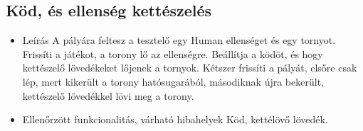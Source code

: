 \subsection{Köd, és ellenség kettészelés}
\begin{itemize}
\item Leírás\newline
A pályára feltesz a tesztelő egy Human ellenséget és egy tornyot. Frissíti a játékot, a torony lő az ellenségre. Beállítja a ködöt, és hogy kettészelő lövedékeket lőjenek a tornyok. Kétszer frissíti a pályát, elsőre csak lép, mert kikerült a torony hatósugarából, másodiknak újra bekerült, kettészelő lövedékkel lövi meg a torony.	
\item Ellenőrzött funkcionalitás, várható hibahelyek\newline
Köd, kettélövő lövedék.


\end{itemize}
